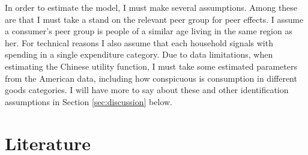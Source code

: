 \documentclass[11pt]{article}
\begin{document}
\begin{CJK}{UTF8}{gbsn}
In order to estimate the model, I must make several assumptions.  Among these are that I must take a stand on the relevant peer group for peer effects.  I assume a consumer's peer group is people of a similar age living in the same region as her.  For technical reasons I also assume that each household signals with spending in a single expenditure category.  Due to data limitations, when estimating the Chinese utility function, I must take some estimated parameters from the American data, including how conspicuous is consumption in different goods categories.  I will have more to say about these and other identification assumptions in Section \ref{sec:discussion} below.


\section{Literature}





\end{CJK}
\end{document}

